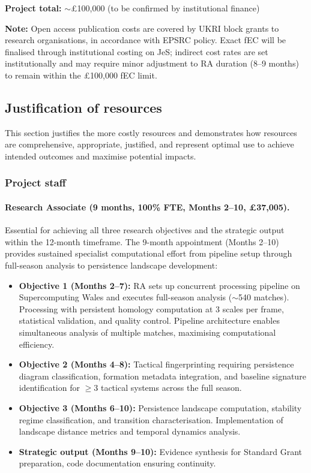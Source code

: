 \textbf{Project total:} $\sim$\pounds100{,}000 (to be confirmed by institutional finance)

\medskip
\noindent\textbf{Note:} Open access publication costs are covered by UKRI block grants to research organisations, in accordance with EPSRC policy. Exact fEC will be finalised through institutional costing on JeS; indirect cost rates are set institutionally and may require minor adjustment to RA duration (8--9 months) to remain within the \pounds100{,}000 fEC limit.

\subsection{Justification of resources}

This section justifies the more costly resources and demonstrates how resources are comprehensive, appropriate, justified, and represent optimal use to achieve intended outcomes and maximise potential impacts.

\subsubsection{Project staff}

\paragraph{Research Associate (9 months, 100\% FTE, Months 2--10, \pounds37{,}005).}
Essential for achieving all three research objectives and the strategic output within the 12-month timeframe. The 9-month appointment (Months 2--10) provides sustained specialist computational effort from pipeline setup through full-season analysis to persistence landscape development:
\begin{itemize}
  \item \textbf{Objective 1 (Months 2--7):} RA sets up concurrent processing pipeline on Supercomputing Wales and executes full-season analysis ($\sim$540 matches). Processing with persistent homology computation at 3 scales per frame, statistical validation, and quality control. Pipeline architecture enables simultaneous analysis of multiple matches, maximising computational efficiency.
  \item \textbf{Objective 2 (Months 4--8):} Tactical fingerprinting requiring persistence diagram classification, formation metadata integration, and baseline signature identification for $\geq 3$ tactical systems across the full season.
  \item \textbf{Objective 3 (Months 6--10):} Persistence landscape computation, stability regime classification, and transition characterisation. Implementation of landscape distance metrics and temporal dynamics analysis.
  \item \textbf{Strategic output (Months 9--10):} Evidence synthesis for Standard Grant preparation, code documentation ensuring continuity.
\end{itemize}

